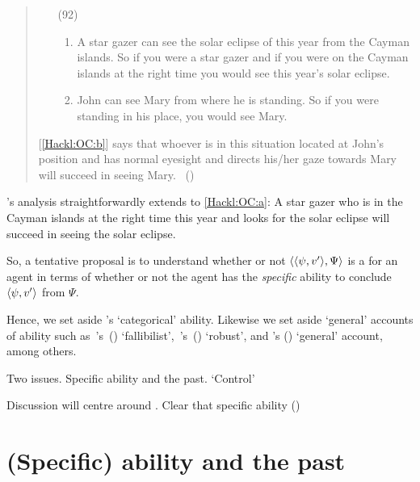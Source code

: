 \begin{note}
  \begin{quote}
    \begin{enumerate}
    \item[(92)]
      \begin{enumerate}[label=\alph*., ref=(\alph*)]
      \item
        \label{Hackl:OC:a}
        A star gazer can see the solar eclipse of this year from the Cayman islands.\newline
        So if you were a star gazer and if you were on the Cayman islands at the right time you would see this year's solar eclipse.
      \item
        \label{Hackl:OC:b}
        John can see Mary from where he is standing.\newline
        So if you were standing in his place, you would see Mary.
      \end{enumerate}
    \end{enumerate}

    [\ref{Hackl:OC:b}] says that whoever is in this situation located at John's position and has normal eyesight and directs his/her gaze towards Mary will succeed in seeing Mary.%
    \mbox{ }\hfill\mbox{(\citeyear[39]{Hackl:1998tt})}
  \end{quote}
  \citeauthor{Hackl:1998tt}'s analysis straightforwardly extends to \ref{Hackl:OC:a}:
  A star gazer who is in the Cayman islands at the right time this year and looks for the solar eclipse will succeed in seeing the solar eclipse.

  So, a tentative proposal is to understand whether or not \(\langle \langle \psi, v' \rangle, \Psi \rangle\) is a \fc{} for an agent in terms of whether or not the agent has the \emph{specific} ability to conclude \(\langle \psi, v' \rangle\) from \(\Psi\).

  Hence, we set aside \citeauthor{Austin:1961vz}'s `categorical' ability.
  Likewise we set aside `general' accounts of ability such as~\citeauthor{Carter:2021wd}'s~(\citeyear{Carter:2021wd}) `fallibilist',~\citeauthor{Kikkert:2022wp}'s~(\citeyear{Kikkert:2022wp}) `robust', and \citeauthor{Maier:2013vk}'s (\citeyear{Maier:2013vk}) `general' account, among others.

  Two issues.
  Specific ability and the past.
  `Control'

  Discussion will centre around \textcite{Boylan:2020aa}.
  Clear that specific ability (\citeyear[23, fn.3]{Boylan:2020aa})
\end{note}

\section{(Specific) ability and the past}
\label{cha:sec:fcs-def:ability:past}

